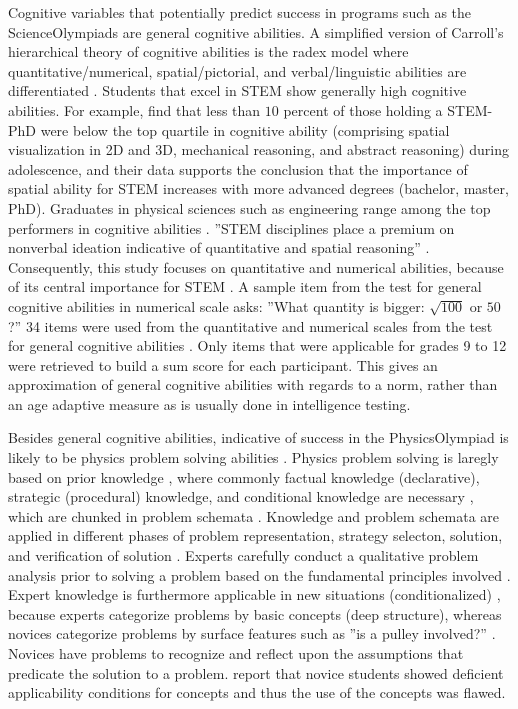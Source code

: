 \documentclass[]{interact}
\begin{document}
Cognitive variables that potentially predict success in programs such as the ScienceOlympiads are general cognitive abilities. A simplified version of Carroll's hierarchical theory of cognitive abilities is the radex model where quantitative/numerical, spatial/pictorial, and verbal/linguistic abilities are differentiated \citep{Snow.1997}. Students that excel in STEM show generally high cognitive abilities. For example, \cite{Wai.2009} find that less than $10$ percent of those holding a STEM-PhD were below the top quartile in cognitive ability (comprising spatial visualization in 2D and 3D, mechanical reasoning, and abstract reasoning) during adolescence, and their data supports the conclusion that the importance of spatial ability for STEM increases with more advanced degrees (bachelor, master, PhD). Graduates in physical sciences such as engineering range among the top performers in cognitive abilities \citep[see also:][]{Shea.2001}. ''STEM disciplines place a premium on nonverbal ideation indicative of quantitative and spatial reasoning'' \citep{Lubinski.2010}. Consequently, this study focuses on quantitative and numerical abilities, because of its central importance for STEM \citep{Wai.2009}. A sample item from the test for general cognitive abilities in numerical scale asks: ''What quantity is bigger: $\sqrt{100}$ or $50$?'' 34 items were used from the quantitative and numerical scales from the test for general cognitive abilities \citep{Heller.2007}. Only items that were applicable for grades 9 to 12 were retrieved to build a sum score for each participant. This gives an approximation of general cognitive abilities with regards to a norm, rather than an age adaptive measure as is usually done in intelligence testing.


Besides general cognitive abilities, indicative of success in the PhysicsOlympiad is likely to be physics problem solving abilities \citep{Maloney.2011}. Physics problem solving is laregly based on prior knowledge \citep{Bhaskar.1977}, where commonly factual knowledge (declarative), strategic (procedural) knowledge, and conditional knowledge are necessary \citep{Anderson.1996}, which are chunked in problem schemata \citep{Reinhold.1999}. Knowledge  and problem schemata are applied in different phases of problem representation, strategy selecton, solution, and verification of solution \citep{Polya.1945,Mayer.2013}. Experts carefully conduct a qualitative problem analysis prior to solving a problem based on the fundamental principles involved \citep{Larkin.1980,Chi.1981}. Expert knowledge is furthermore applicable in new situations (conditionalized) \citep{Simon.1980,Glaser.1992}, because experts categorize problems by basic concepts (deep structure), whereas novices categorize problems by surface features such as ''is a pulley involved?'' \citep{Chi.1981,Schwartz.2015}. Novices have problems to recognize and reflect upon the assumptions that predicate the solution to a problem. \cite{Reif.1992} report that novice students showed deficient applicability conditions for concepts and thus the use of the concepts was flawed.
\end{document}
